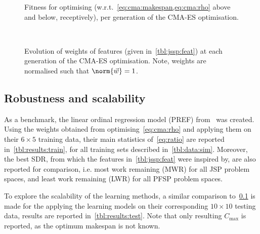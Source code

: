 \documentclass{acm_proc_article-sp}
\begin{document}
\begin{figure} %
\caption{Fitness for optimising (w.r.t.~\cref{eq:cma:makespan,eq:cma:rho} above and below, receptively), per generation of the CMA-ES optimisation.}\label{fig:cma:fit}
\end{figure}

\begin{figure*} 
~
\caption{Evolution of weights of features (given in~\cref{tbl:jssp:feat}) at each generation of the CMA-ES optimisation. Note, weights are normalised such that $\norm{\vec{w}}=1$.}\label{fig:cma:wei}
\end{figure*}


\subsection{Robustness and  scalability}\label{sec:expr:robust} 
As a benchmark, the linear ordinal regression model (PREF) from~\cite{InRu11a} was created.
Using the weights obtained from optimising~\cref{eq:cma:rho} and applying them on their  $6\times5$ training data, their main statistics of~\cref{eq:ratio} are reported in~\cref{tbl:results:train}, for all training sets described in~\cref{tbl:data:sim}. Moreover, the best SDR, from which the features in~\cref{tbl:jssp:feat} were inspired by, are also reported for comparison, i.e. most work remaining (MWR) for all JSP problem spaces, and least work remaining (LWR) for all PFSP problem spaces.

To explore the scalability of the learning methods, a similar comparison to~\cref{sec:expr:robust} is made for the applying the learning models on their corresponding $10\times10$ testing data, results are reported in~\cref{tbl:results:test}. Note that only resulting $C_{\max}$ is reported, as the optimum makespan is not known. 
\end{document}
